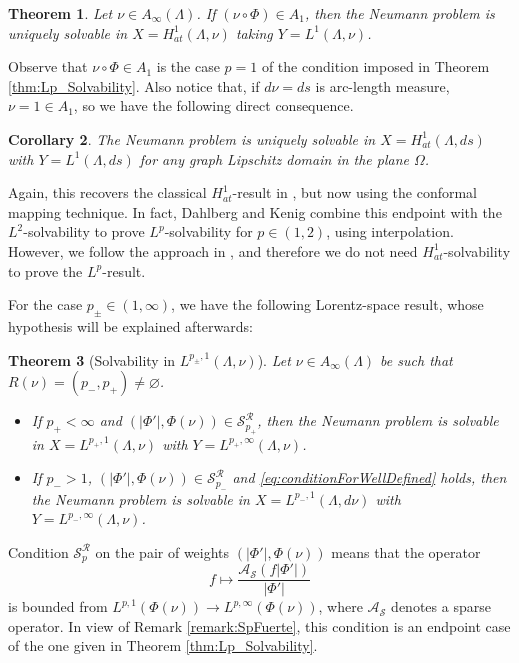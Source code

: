 \documentclass[12pt]{amsart}
\theoremstyle{plain}
\newtheorem{theorem}{Theorem}[section]
\newtheorem{corollary}[theorem]{Corollary}
\theoremstyle{definition}
\numberwithin{equation}{section}
\begin{document}
\begin{theorem}\label{thm:H1solvability}
    Let $\nu\in A_{\infty}(\Lambda)$. If $(\nu\circ\Phi)\in A_1$, then the Neumann problem is uniquely solvable in $X=H_{at}^1(\Lambda,\nu)$ taking $Y=L^1(\Lambda,\nu)$.
\end{theorem}

Observe that $\nu\circ\Phi\in A_1$ is the case $p=1$ of the condition imposed in Theorem \ref{thm:Lp_Solvability}. Also notice that, if $d\nu=ds$ is arc-length measure,  $\nu= 1\in A_1$, so we have the following direct consequence.

\begin{corollary}
The Neumann problem is uniquely solvable in $X=H_{at}^{1}(\Lambda,ds)$ with $Y=L^1(\Lambda,ds)$ for any graph Lipschitz domain in the plane $\Omega$. 
\end{corollary}

Again, this recovers the classical $H_{at}^{1}$-result in \cite{DahlbergKenig}, but now using the conformal mapping technique. In fact, Dahlberg and Kenig combine this endpoint with the $L^2$-solvability to prove $L^p$-solvability for $p\in (1,2)$, using interpolation. However, we follow the approach in \cite{CNO}, and therefore we do not need $H_{at}^1$-solvability to prove the $L^p$-result.



For the case $p_{\pm}\in (1,\infty)$, we have the following Lorentz-space result, whose hypothesis will be explained afterwards:

\begin{theorem}[Solvability in $L^{p_{\pm},1}(\Lambda,\nu)$]\label{thm:Lp1_Solvability}
    Let $\nu\in A_{\infty}(\Lambda)$ be such that $R(\nu)=(p_{-},p_{+})\neq\varnothing$.
    \begin{itemize}
        \item If $p_{+}<\infty$ and $(|\Phi'|,\Phi(\nu))\in \mathcal{S}_{p_{+}}^{\mathcal{R}}$, then the Neumann problem is solvable in $X=L^{p_{+},1}(\Lambda,\nu)$ with $Y=L^{p_{+},\infty}(\Lambda,\nu)$.
        \item If $p_{-}>1$, $(|\Phi'|,\Phi(\nu))\in \mathcal{S}_{p_{-}}^{\mathcal{R}}$ and \eqref{eq:conditionForWellDefined} holds, then the Neumann problem is solvable in $X=L^{p_{-},1}(\Lambda,d\nu)$ with $Y=L^{p_{-},\infty}(\Lambda, \nu)$. 
    \end{itemize}
\end{theorem}



Condition $\mathcal{S}_{p}^{\mathcal{R}}$ on the pair of weights $(|\Phi'|,\Phi(\nu))$ means that the operator 
\[
f\mapsto \frac{\mathcal{A}_{\mathcal{S}}(f|\Phi'|)}{|\Phi'|}
\]
is bounded from $L^{p,1}(\Phi(\nu))\to L^{p,\infty}(\Phi(\nu))$, where $\mathcal{A}_{\mathcal{S}}$ denotes a sparse operator. In view of Remark \ref{remark:SpFuerte}, this condition is an endpoint case of the one given in Theorem \ref{thm:Lp_Solvability}.
\end{document}
